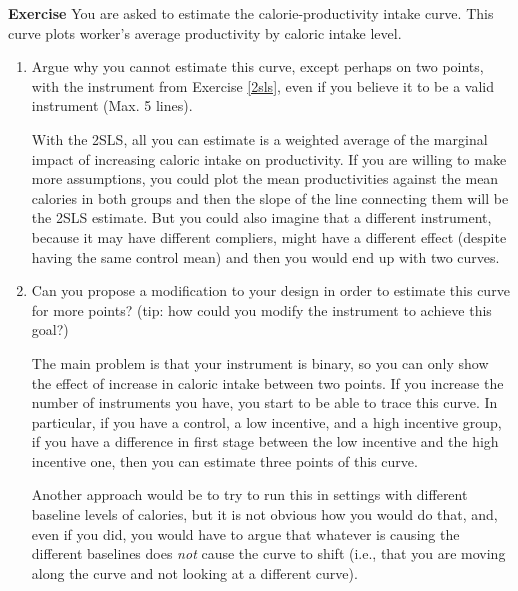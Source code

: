 \documentclass[10pt]{article}
\newcounter{exercise}
\newenvironment{exercise}%
{%
	\refstepcounter{exercise}%
	\textbf{Exercise \theexercise}%
	}%
{
 \par\vspace{\baselineskip}%
\noindent\ignorespacesafterend
}
\begin{document}
\begin{exercise}\label{ext_val}
	You are asked to estimate the calorie-productivity intake curve. This curve plots worker's average productivity by caloric intake level. 
	\begin{enumerate}
		\item Argue why you cannot estimate this curve, except perhaps on two points, with the instrument from Exercise \ref{2sls}, even if you believe it to be a valid instrument (Max. 5 lines).
		\color{red}
		
			With the 2SLS, all you can estimate is a weighted average of the marginal impact of increasing caloric intake on productivity. If you are willing to make more assumptions, you could plot the mean productivities against the mean calories in both groups and then the slope of the line connecting them will be the 2SLS estimate. But you could also imagine that a different instrument, because it may have different compliers, might have a different effect (despite having the same control mean) and then you would end up with two curves. 
		
		\color{black}
		\item Can you propose a modification to your design in order to estimate this curve for more points? (tip: how could you modify the instrument to achieve this goal?)		
		\color{red}
		
		The main problem is that your instrument is binary, so you can only show the effect of increase in caloric intake between two points. If you increase the number of instruments you have, you start to be able to trace this curve. In particular, if you have a control, a low incentive, and a high incentive group, if you have a difference in first stage between the low incentive and the high incentive one, then you can estimate three points of this curve.
		
		Another approach would be to try to run this in settings with different baseline levels of calories, but it is not obvious how you would do that, and, even if you did, you would have to argue that whatever is causing the different baselines does \textit{not} cause the curve to shift (i.e., that you are moving along the curve and not looking at a different curve). 
		
		\color{black}
	\end{enumerate}
\end{exercise}


\end{document}
